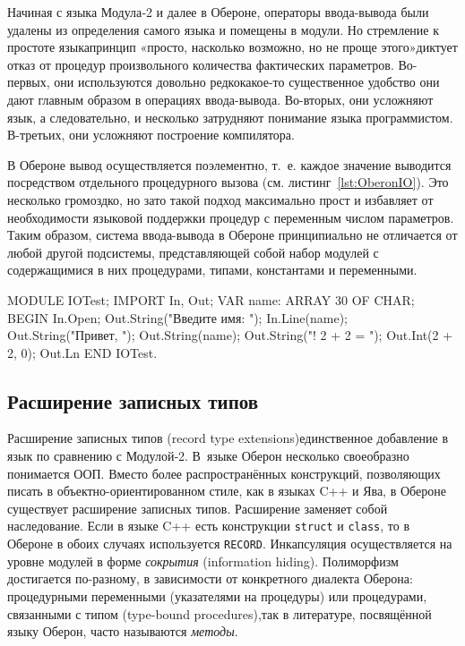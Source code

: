 \documentclass[utf8]{lgu}
\newcommand{\tire}{\unskip\nobreak\thinspace\textemdash\thinspace}
\newcommand{\code}[1]{{\normalsize\texttt{#1}}}
\begin{document}
Начиная с языка Модула‑2 и далее в Обероне, операторы ввода-вывода были удалены из определения самого языка и помещены в модули. Но стремление к простоте языка\tire принцип «просто, насколько возможно, но не проще этого»\tire диктует отказ от процедур произвольного количества фактических параметров. Во-первых, они используются довольно редко\tire какое-то существенное удобство они дают главным образом в операциях ввода-вывода. Во-вторых, они усложняют язык, а следовательно, и несколько затрудняют понимание языка программистом. В-третьих, они усложняют построение компилятора.

В Обероне вывод осуществляется поэлементно, т.~е. каждое значение выводится посредством отдельного процедурного вызова (см. листинг~\ref{lst:OberonIO}). Это несколько громоздко, но зато такой подход максимально прост и избавляет от необходимости языковой поддержки процедур с переменным числом параметров. Таким образом, система ввода-вывода в Обероне принципиально не отличается от любой другой подсистемы, представляющей собой набор модулей с содержащимися в них процедурами, типами, константами и переменными.

\begin{listing}[H]
\caption{Система ввода-вывода в Обероне}
\vspace{-17pt}
\label{lst:OberonIO}
\begin{modula2}
MODULE IOTest;
IMPORT In, Out;
VAR name: ARRAY 30 OF CHAR;
BEGIN
  In.Open;
  Out.String("Введите имя: ");
  In.Line(name);
  Out.String("Привет, ");
  Out.String(name);
  Out.String("! 2 + 2 = ");
  Out.Int(2 + 2, 0);
  Out.Ln
END IOTest.
\end{modula2}
\end{listing}

\subsection{Расширение записных типов}

\firstparskip Расширение записных типов (record type extensions)\tire единственное добавление в язык по сравнению с Модулой‑2. В~языке Оберон несколько своеобразно понимается ООП. Вместо более распространённых конструкций, позволяющих писать в объектно-ориентированном стиле, как в языках C++ и Ява, в Обероне существует расширение записных типов. Расширение заменяет собой наследование. Если в языке C++ есть конструкции \code{struct} и \code{class}, то в Обероне в обоих случаях используется \code{RECORD}. Инкапсуляция осуществляется на уровне модулей в форме \textit{сокрытия} (information hiding). Полиморфизм достигается по-разному, в зависимости от конкретного диалекта Оберона: процедурными переменными (указателями на процедуры) или процедурами, связанными с типом (type-bound procedures),\tire так в литературе, посвящённой языку Оберон, часто называются \textit{методы}.
\end{document}
